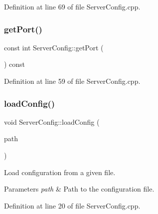 Definition at line 69 of file Server\+Config.\+cpp.

\mbox{\label{class_zia_1_1_server_config_ad8095c8981f48e9fa4112de41d4e6657}} 
\subsubsection{\texorpdfstring{get\+Port()}{getPort()}}
{\footnotesize\ttfamily const int Server\+Config\+::get\+Port (\begin{DoxyParamCaption}{ }\end{DoxyParamCaption}) const\hspace{0.3cm}{\ttfamily [noexcept]}}



Definition at line 59 of file Server\+Config.\+cpp.

\mbox{\label{class_zia_1_1_server_config_ad50ff700e0dd38f66017ce229f89717e}} 
\subsubsection{\texorpdfstring{load\+Config()}{loadConfig()}}
{\footnotesize\ttfamily void Server\+Config\+::load\+Config (\begin{DoxyParamCaption}\item[{const std\+::filesystem\+::path \&}]{path }\end{DoxyParamCaption})}



Load configuration from a given file. 


\begin{DoxyParams}{Parameters}
{\em path} & Path to the configuration file. \\
\hline
\end{DoxyParams}


Definition at line 20 of file Server\+Config.\+cpp.

\mbox{\label{class_zia_1_1_server_config_a4467dc6237876b82ad5970b2f6ee1966}} 
